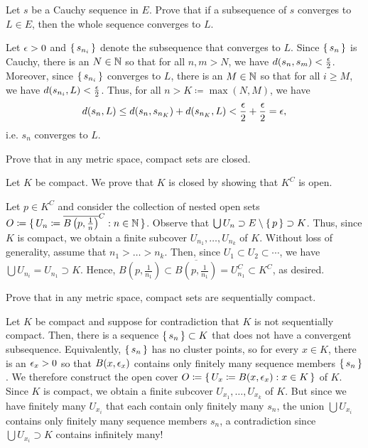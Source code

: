 \documentclass{article}
\begin{document}
\begin{problem}
Let $s$ be a Cauchy sequence in $E$.
Prove that if a subsequence of $s$ converges to $L \in E$, then the whole sequence converges to $L$.
\begin{solution}
	Let $\epsilon > 0$ and $\set{s_{n_i}}$ denote the subsequence that converges to $L$.
	Since $\set{s_n}$ is Cauchy, there is an $N \in \mathbb{N}$ so that for all $n, m > N$, we have $d(s_n, s_m) < \frac{\epsilon}2$.
	Moreover, since $\set{s_{n_i}}$ converges to $L$, there is an $M \in \mathbb{N}$ so that for all $i \ge M$, we have $d(s_{n_i}, L) < \frac{\epsilon}2$.
	Thus, for all $n > K \coloneq \max(N, M)$, we have
	\[
		d(s_n, L) \le d(s_n, s_{n_K}) + d(s_{n_K}, L) < \frac{\epsilon}2 + \frac{\epsilon}2 = \epsilon,
	\]
	i.e. $s_n$ converges to $L$.
\end{solution}
\end{problem}

\begin{problem}
Prove that in any metric space, compact sets are closed.
\begin{solution}
	Let $K$ be compact.
	We prove that $K$ is closed by showing that $K^C$ is open.

	Let $p \in K^C$ and consider the collection of nested open sets $O \coloneq \set{ U_n \coloneq \overline{B\left(p, \frac1n\right)}^C : n \in \mathbb{N}}$.
	Observe that $\bigcup U_n \supset E \setminus \set{ p } \supset K$.
	Thus, since $K$ is compact, we obtain a finite subcover $U_{n_1}, \dots, U_{n_k}$ of $K$.
	Without loss of generality, assume that $n_1 > \dots > n_k$.
	Then, since $U_1 \subset U_2 \subset \cdots$, we have $\bigcup U_{n_i} = U_{n_1} \supset K$.
	Hence, $B\left(p, \frac1{n_1}\right) \subset \overline{B\left(p, \frac1{n_1}\right)} = U_{n_1}^C \subset K^C$, as desired.
\end{solution}
\end{problem}

\begin{problem}
Prove that in any metric space, compact sets are sequentially compact.
\begin{solution}
	Let $K$ be compact and suppose for contradiction that $K$ is not sequentially compact.
	Then, there is a sequence $\set{ s_n } \subset K$ that does not have a convergent subsequence.
	Equivalently, $\set{ s_n }$ has no cluster points, so for every $x \in K$, there is an $\epsilon_x > 0$ so that $B(x, \epsilon_x)$ contains only finitely many sequence members $\set{ s_n }$.
	We therefore construct the open cover $O \coloneq \set{ U_x \coloneq B(x, \epsilon_x) : x \in K }$ of $K$.
	Since $K$ is compact, we obtain a finite subcover $U_{x_1}, \dots, U_{x_k}$ of $K$.
	But since we have finitely many $U_{x_i}$ that each contain only finitely many $s_n$, the union $\bigcup U_{x_i}$ contains only finitely many sequence members $s_n$, a contradiction since $\bigcup U_{x_i} \supset K$ contains infinitely many!
\end{solution}
\end{problem}
\end{document}
